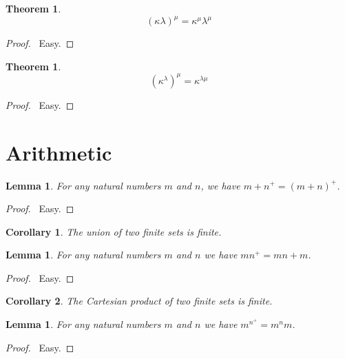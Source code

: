 \documentclass{article}
\let\qed\relax
\newtheorem{lemma}[axiom]{Lemma}
\newtheorem{theorem}[axiom]{Theorem}
\newtheorem{corollary}{Corollary}[axiom]
\theoremstyle{definition}
\begin{document}
    \begin{theorem}
        \[ (\kappa \lambda)^\mu = \kappa^\mu \lambda^\mu \]
    \end{theorem}

    \begin{proof}
        \pf\ Easy. \qed
    \end{proof}

    \begin{theorem}
        \[ (\kappa^\lambda)^\mu = \kappa^{\lambda \mu} \]
    \end{theorem}

    \begin{proof}
        \pf\ Easy. \qed
    \end{proof}

    \section{Arithmetic}

    \begin{lemma}
        For any natural numbers $m$ and $n$, we have $m + n^+ = (m+n)^+$.
    \end{lemma}

    \begin{proof}
        \pf\ Easy. \qed
    \end{proof}

    \begin{corollary}
        The union of two finite sets is finite.
    \end{corollary}

    \begin{lemma}
        For any natural numbers $m$ and $n$ we have $m n^+ = mn + m$.
    \end{lemma}

    \begin{proof}
        \pf\ Easy. \qed
    \end{proof}

    \begin{corollary}
        The Cartesian product of two finite sets is finite.
    \end{corollary}

    \begin{lemma}
        For any natural numbers $m$ and $n$ we have $m^{n^+} = m^n m$.
    \end{lemma}

    \begin{proof}
        \pf\ Easy. \qed
    \end{proof}
\end{document}
